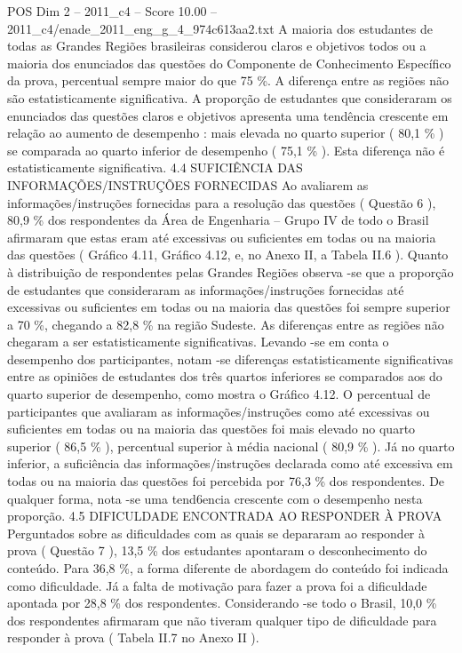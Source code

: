 \begin{textsample}{POS Dim 2 – 2011\_c4 – Score 10.00 – 2011\_c4/enade\_2011\_eng\_g\_4\_974c613aa2.txt}
A maioria dos estudantes de todas as Grandes Regiões brasileiras considerou claros e objetivos todos ou a maioria dos enunciados das questões do Componente de Conhecimento Específico da prova, percentual sempre maior do que 75 \%.
A diferença entre as regiões não são estatisticamente significativa.
A proporção de estudantes que consideraram os enunciados das questões claros e objetivos apresenta uma tendência crescente em relação ao aumento de desempenho : mais elevada no quarto superior ( 80,1 \% ) se comparada ao quarto inferior de desempenho ( 75,1 \% ).
Esta diferença não é estatisticamente significativa. 4.4 SUFICIÊNCIA DAS INFORMAÇÕES/INSTRUÇÕES FORNECIDAS Ao avaliarem as informações/instruções fornecidas para a resolução das questões ( Questão 6 ), 80,9 \% dos respondentes da Área de Engenharia – Grupo IV de todo o Brasil afirmaram que estas eram até excessivas ou suficientes em todas ou na maioria das questões ( Gráfico 4.11, Gráfico 4.12, e, no Anexo II, a Tabela II.6 ).
Quanto à distribuição de respondentes pelas Grandes Regiões observa -se que a proporção de estudantes que consideraram as informações/instruções fornecidas até excessivas ou suficientes em todas ou na maioria das questões foi sempre superior a 70 \%, chegando a 82,8 \% na região Sudeste.
As diferenças entre as regiões não chegaram a ser estatisticamente significativas.
Levando -se em conta o desempenho dos participantes, notam -se diferenças estatisticamente significativas entre as opiniões de estudantes dos três quartos inferiores se comparados aos do quarto superior de desempenho, como mostra o Gráfico 4.12.
O percentual de participantes que avaliaram as informações/instruções como até excessivas ou suficientes em todas ou na maioria das questões foi mais elevado no quarto superior ( 86,5 \% ), percentual superior à média nacional ( 80,9 \% ).
Já no quarto inferior, a suficiência das informações/instruções declarada como até excessiva em todas ou na maioria das questões foi percebida por 76,3 \% dos respondentes.
De qualquer forma, nota -se uma tend6encia crescente com o desempenho nesta proporção. 4.5 DIFICULDADE ENCONTRADA AO RESPONDER À PROVA Perguntados sobre as dificuldades com as quais se depararam ao responder à prova ( Questão 7 ), 13,5 \% dos estudantes apontaram o desconhecimento do conteúdo.
Para 36,8 \%, a forma diferente de abordagem do conteúdo foi indicada como dificuldade.
Já a falta de motivação para fazer a prova foi a dificuldade apontada por 28,8 \% dos respondentes.
Considerando -se todo o Brasil, 10,0 \% dos respondentes afirmaram que não tiveram qualquer tipo de dificuldade para responder à prova ( Tabela II.7 no Anexo II ).

\end{textsample}
